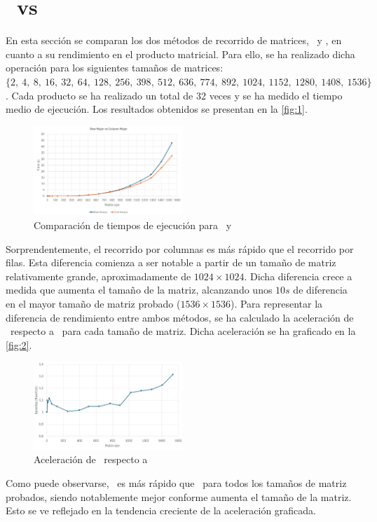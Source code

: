 \pagestyle{fancy}
\fancyhead[l]{\autorUO}
\fancyfoot[l]{\asignaturaAbbr}
\fancyfoot[r]{\fecha}

\section{\rowmajor\ vs \colmajor} \label{sec:3}
En esta sección se comparan los dos métodos de recorrido de matrices, \rowmajor\ y \colmajor, en cuanto a su rendimiento en el producto matricial.
Para ello, se ha realizado dicha operación para los siguientes tamaños de matrices: 
$\{2,\ 4,\ 8,\ 16,\ 32,\ 64,\ 128,\ 256,\ 398,\ 512,\ 636,\ 774,\ 892,\ 1024,\ 1152,\ 1280,\ 1408,\ 1536\}$. Cada producto se ha realizado un total 
de 32 veces y se ha medido el tiempo medio de ejecución. Los resultados obtenidos se presentan en la \autoref{fig:1}.

\begin{figure}[h]
    \centering
    \includegraphics[width=0.5\textwidth]{img/1.png}
    \caption{Comparación de tiempos de ejecución para \rowmajor\ y \colmajor}
    \label{fig:1}
\end{figure}

Sorprendentemente, el recorrido por columnas es más rápido que el recorrido por filas. Esta diferencia comienza a ser notable 
a partir de un tamaño de matriz relativamente grande, aproximadamente de $1024 \times 1024$.
Dicha diferencia crece a medida que aumenta el tamaño de la matriz, alcanzando unos $10s$ de diferencia en el mayor tamaño de matriz 
probado ($1536 \times 1536$).
Para representar la diferencia de rendimiento entre ambos métodos, se ha calculado la aceleración de \rowmajor\ respecto a \colmajor\ para cada tamaño de matriz.
Dicha aceleración se ha graficado en la \autoref{fig:2}.

\begin{figure}[h]
    \centering
    \includegraphics[width=0.5\textwidth]{img/2.png}
    \caption{Aceleración de \rowmajor\ respecto a \colmajor}
    \label{fig:2}
\end{figure}

Como puede observarse, \colmajor\ es más rápido que \rowmajor\ para todos los tamaños de matriz probados, siendo notablemente 
mejor conforme aumenta el tamaño de la matriz. Esto se ve reflejado en la tendencia creciente de la aceleración graficada.